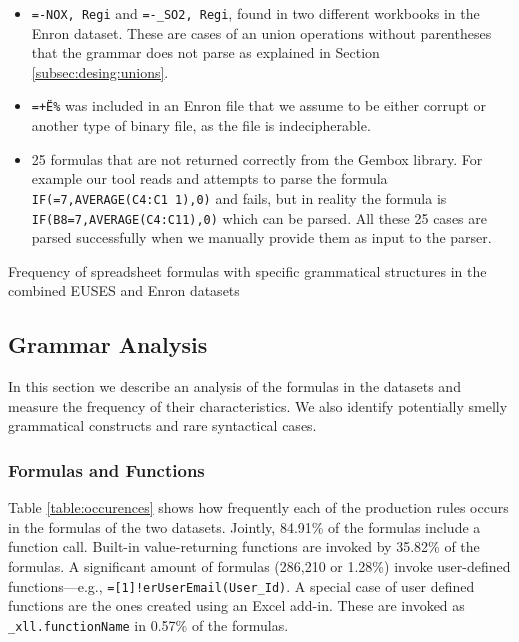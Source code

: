 \documentclass[conference]{IEEEtran}
\begin{document}
\begin{itemize}
	\item \texttt{=-NOX, Regi} and \texttt{=-_SO2, Regi}, found in two different workbooks in the Enron dataset. These are cases of an union operations without parentheses that the grammar does not parse as explained in Section \ref{subsec:desing:unions}.
	\item \texttt{=+Ë\%} was included in an Enron file that we assume to be either corrupt or another type of binary file, as the file is indecipherable.
	\item 25 formulas that are not returned correctly from the Gembox library. For example our tool reads and attempts to parse the formula \texttt{IF(=7,AVERAGE(C4:C1 1),0)} and fails, but in reality the formula is \texttt{IF(B8=7,AVERAGE(C4:C11),0)} which can be parsed. All these 25 cases are parsed successfully when we manually provide them as input to the parser.
\end{itemize}

\begin{table}
	\vspace{2mm}
	\caption{Frequency of spreadsheet formulas with specific grammatical structures in the combined EUSES and Enron datasets}
	\label{table:occurences}
	\centering
	
\end{table}
\subsection{Grammar Analysis}
\label{subsection:grammarAnalysis}
In this section we describe an analysis of the formulas in the datasets and measure the frequency of their characteristics. We also identify potentially smelly grammatical constructs and rare syntactical cases.

\subsubsection{Formulas and Functions}

Table \ref{table:occurences} shows how frequently each of the production rules occurs in the formulas of the two datasets. Jointly, 84.91\% of the formulas include a function call. Built-in value-returning functions are invoked by 35.82\% of the formulas.
A significant amount of formulas (286,210 or 1.28\%) invoke user-defined functions---e.g., \texttt{=[1]!erUserEmail(User_Id)}. A special case of user defined functions are the ones created using an Excel add-in. These are invoked as \texttt{_xll.functionName} in 0.57\% of the formulas.
\end{document}
